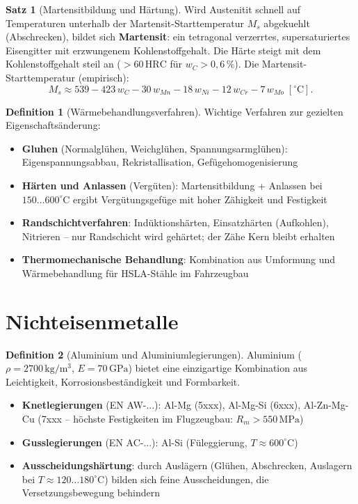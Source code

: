 ﻿\documentclass[a4paper,12pt]{report}
\theoremstyle{definition}
\newtheorem{definition}{Definition}
\newtheorem{satz}{Satz}
\begin{document}
\begin{satz}[Martensitbildung und H\"artung]
Wird Austenitit schnell auf Temperaturen unterhalb der Martensit-Starttemperatur
$M_s$ abgekuehlt (Abschrecken), bildet sich \textbf{Martensit}:
ein tetragonal verzerrtes, supersaturiertes Eisengitter mit
erzwungenem Kohlenstoffgehalt. Die H\"arte steigt mit dem Kohlenstoffgehalt
steil an ($> 60\,\mathrm{HRC}$ f\"ur $w_C > 0{,}6\,\%$).
Die Martensit-Starttemperatur (empirisch):
\[
  M_s \approx 539 - 423\,w_C - 30\,w_{Mn} - 18\,w_{Ni} - 12\,w_{Cr} - 7\,w_{Mo}\;[^\circ\mathrm{C}].
\]
\end{satz}

\begin{definition}[W\"armebehandlungsverfahren]
Wichtige Verfahren zur gezielten Eigenschafts\"anderung:
\begin{itemize}
    \item[-] \textbf{Gluhen} (Normalgl\"uhen, Weichgl\"uhen, Spannungsarmgl\"uhen):
          Eigenspannungsabbau, Rekristallisation, Gef\"ugehomogenisierung
    \item[-] \textbf{H\"arten und Anlassen} (Verg\"uten): Martensitbildung + Anlassen
          bei $150\ldots600^\circ\mathrm{C}$ ergibt Verg\"utungsgef\"uge
          mit hoher Z\"ahigkeit und Festigkeit
    \item[-] \textbf{Randschichtverfahren}: Ind\"uktionsh\"arten, Einsatzh\"arten
          (Aufkohlen), Nitrieren -- nur Randschicht wird geh\"artet;
          der Z\"ahe Kern bleibt erhalten
    \item[-] \textbf{Thermomechanische Behandlung}: Kombination aus Umformung
          und W\"armebehandlung f\"ur HSLA-St\"ahle im Fahrzeugbau
\end{itemize}
\end{definition}

\section{Nichteisenmetalle}

\begin{definition}[Aluminium und Aluminiumlegierungen]
Aluminium ($\rho = 2700\,\mathrm{kg/m^3}$, $E = 70\,\mathrm{GPa}$) bietet
eine einzigartige Kombination aus Leichtigkeit, Korrosionsbest\"andigkeit
und Formbarkeit.
\begin{itemize}
    \item[-] \textbf{Knetlegierungen} (EN AW-...): Al-Mg (5xxx), Al-Mg-Si (6xxx),
          Al-Zn-Mg-Cu (7xxx -- h\"ochste Festigkeiten im Flugzeugbau: $R_m > 550\,\mathrm{MPa}$)
    \item[-] \textbf{Gusslegierungen} (EN AC-...): Al-Si (F\"uleggierung, $T\approx600^\circ\mathrm{C}$)
    \item[-] \textbf{Ausscheidungsh\"artung}: durch Ausl\"agern (Glühen, Abschrecken,
          Auslagern bei $T\approx 120\ldots180^\circ\mathrm{C}$) bilden sich
          feine Ausscheidungen, die Versetzungsbewegung behindern
\end{itemize}
\end{definition}
\end{document}
